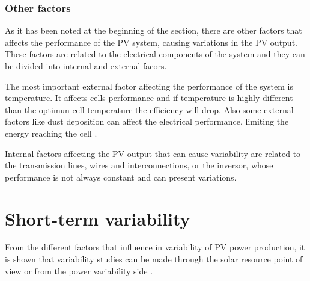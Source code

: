 
\subsubsection{Other factors}

As it has been noted at the beginning of the section, there are other factors that affects the performance of the PV system, causing variations in the PV output. These factors are related to the electrical components of the system and they can be divided into internal and external facors.

The most important external factor affecting the performance of the system is temperature. It affects cells performance and if temperature is highly different than the optimun cell temperature the efficiency will drop. Also some external factors like dust deposition can affect the electrical performance, limiting the energy reaching the cell \cite*{Fan1986, Mekhilef2012,Dubey2013}.

Internal factors affecting the PV output that can cause variability are related to the transmission lines, wires and interconnections, or the inversor, whose performance is not always constant and can present variations.

\section{Short-term variability}%


From the different factors that influence in variability of PV power production, it is shown that variability studies can be made through the solar resource point of view or from the power variability side \cite*{Widen2015}.

